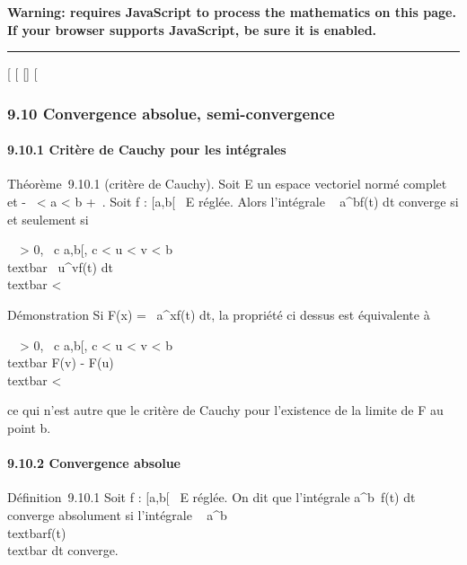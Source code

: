 \textbf{Warning: 
requires JavaScript to process the mathematics on this page.\\ If your
browser supports JavaScript, be sure it is enabled.}

\begin{center}\rule{3in}{0.4pt}\end{center}

{[}
{[}
{[}{]}
{[}

\subsubsection{9.10 Convergence absolue, semi-convergence}

\paragraph{9.10.1 Critère de Cauchy pour les intégrales}

Théorème~9.10.1 (critère de Cauchy). Soit E un espace vectoriel normé
complet et -\infty~ \textless{} a \textless{} b \leq +\infty~. Soit f : {[}a,b{[}\rightarrow~ E
réglée. Alors l'intégrale \int ~
a^bf(t) dt converge si et seulement si~

\forall~~\epsilon \textgreater{} 0,
\exists~c \in {[}a,b{[}, c \textless{} u \textless{} v
\textless{} b \rigtharrow~\\textbar{}\int ~
u^vf(t) dt\\textbar{} \textless{} \epsilon

Démonstration Si F(x) =\int ~
a^xf(t) dt, la propriété ci dessus est équivalente à

\forall~~\epsilon \textgreater{} 0,
\exists~c \in {[}a,b{[}, c \textless{} u \textless{} v
\textless{} b \rigtharrow~\\textbar{} F(v) -
F(u)\\textbar{} \textless{} \epsilon

ce qui n'est autre que le critère de Cauchy pour l'existence de la
limite de F au point b.

\paragraph{9.10.2 Convergence absolue}

Définition~9.10.1 Soit f : {[}a,b{[}\rightarrow~ E réglée. On dit que l'intégrale
\int  a^b~f(t) dt converge
absolument si l'intégrale \int ~
a^b\\textbar{}f(t)\\textbar{}
dt converge.

